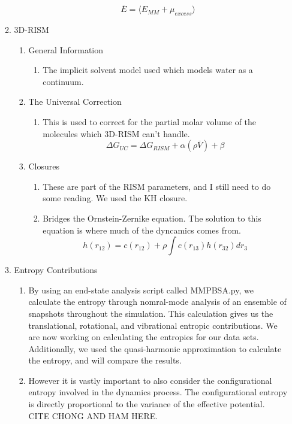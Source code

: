 \documentclass{article}
\begin{document}
\begin{enumerate}
\begin{enumerate}
\begin{enumerate}
			\begin{equation}
				\overline{E}=\langle E_{MM}+\mu_{excess}\rangle
			\end{equation}
		\end{enumerate}
		\item 3D-RISM
		\begin{enumerate}
			\item General Information
			\begin{enumerate}
				\item The implicit solvent model used which models water as a continuum. 
			\end{enumerate}
			\item The Universal Correction
			\begin{enumerate}
				\item This is used to correct for the partial molar volume of the molecules which 3D-RISM can't handle.
					\begin{equation}
						\Delta G_{UC} = \Delta G_{RISM} + \alpha (\rho \overline{V}) + \beta
					\end{equation}
			\end{enumerate}
			\item Closures
			\begin{enumerate}
				\item These are part of the RISM parameters, and I still need to do some reading. We used the KH closure. 
				\item Bridges the Ornstein-Zernike equation. The solution to this equation is where much of the dyncamics comes from.
				\begin{equation}
					h(r_{12})=c(r_{12})+\rho\int c(r_{13})h(r_{32})dr_{3}
				\end{equation}
			\end{enumerate}
		\end{enumerate}
		\item Entropy Contributions
		\begin{enumerate}
			\item By using an end-state analysis script called MMPBSA.py, we calculate the entropy through nomral-mode analysis of an ensemble of snapshots throughout the simulation. This calculation gives us the translational, rotational, and vibrational entropic contributions. We are now working on calculating the entropies for our data sets. Additionally, we used the quasi-harmonic approximation to calculate the entropy, and will compare the results. 
			\item However it is vastly important to also consider the configurational entropy involved in the dynamics process. The configurational entropy is directly proportional to the variance of the effective potential. CITE CHONG AND HAM HERE.

\end{enumerate}
\end{enumerate}
\end{enumerate}
\end{document}
